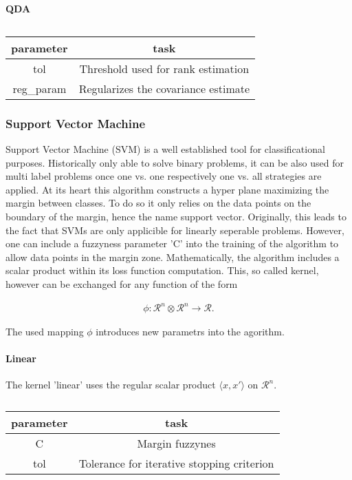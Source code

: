\paragraph{QDA}
%
\begin{table}[h!]
  \centering
  \begin{tabular}{c|c}
    parameter & task \\
    \hline\hline
    tol       & Threshold used for rank estimation \\
    reg\_param& Regularizes the covariance estimate \\
    \hline
  \end{tabular}
  \caption{}
  \label{tab:svd_parameters}
\end{table}
%

\subsubsection{Support Vector Machine}
Support Vector Machine (SVM) is a well established tool for
classificational purposes. Historically only able to solve binary
problems, it can be also used for multi label problems once one
vs. one respectively one vs. all strategies are applied. At its heart
this algorithm constructs a hyper plane maximizing the margin between
classes. To do so it only relies on the data points on the boundary of
the margin, hence the name support vector. Originally, this leads to
the fact that SVMs are only applicible for linearly seperable
problems. However, one can include a fuzzyness parameter 'C' into the
training of the algorithm to allow data points in the margin
zone. Mathematically, the algorithm includes a scalar product within
its loss function computation. This, so called kernel, however can be
exchanged for any function of the form
%
\begin{ceqn}
  \begin{align}
    \phi: \mathcal{R}^n \otimes \mathcal{R}^n \rightarrow \mathcal{R}.
  \end{align}
\end{ceqn}
%
The used mapping $\phi$ introduces new parametrs into the agorithm.

\paragraph{Linear}
The kernel 'linear' uses the regular scalar product $\langle
x,x'\rangle$ on $\mathcal{R}^n$.
%
\begin{table}[h!]
  \centering
  \begin{tabular}{c|c}
    parameter & task \\
    \hline\hline
    C         & Margin fuzzynes \\
    tol       & Tolerance for iterative stopping criterion \\
    \hline
  \end{tabular}
  \caption{}
  \label{tab:linear_parametrs}
\end{table}
%

